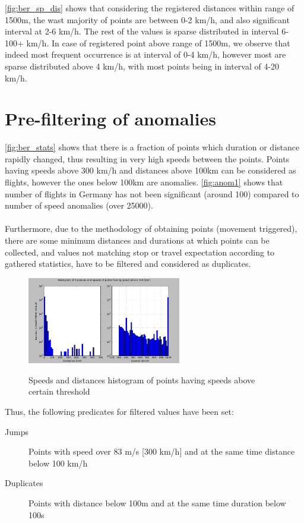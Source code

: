\FloatBarrier
\autoref{fig:ber_sp_dis} shows that considering the registered distances within range of 1500m, the wast majority of points are between 0-2 km/h, and also significant interval at 2-6 km/h. The rest of the values is sparse distributed in interval 6-100+ km/h. In case of registered point above range of 1500m, we observe that indeed most frequent occurrence is at interval of 0-4 km/h, however most are sparse distributed above 4 km/h, with most points being in interval of 4-20 km/h. 

\section{Pre-filtering of anomalies}
\label{cha:prefilter}
\autoref{fig:ber_stats} shows that there is a fraction of points which duration or distance rapidly changed, thus resulting in very high speeds between the points. Points having speeds above 300 km/h and distances above 100km can be considered as flights, however the ones below 100km are anomalies. \autoref{fig:anom1} shows that number of flights in Germany has not been significant (around 100) compared to number of speed anomalies (over 25000).
\\\\
Furthermore, due to the methodology of obtaining points (movement triggered), there are some minimum distances and durations at which points can be collected, and values not matching stop or travel expectation according to gathered statistics, have to be filtered and considered as duplicates. 

\begin{figure}[!ht]
	\centering
	\includegraphics[width=0.6\textwidth]{images/anom1.png}\\
	\caption{ Speeds and distances histogram of points having speeds above certain threshold }
	\label{fig:anom1}
\end{figure}
\FloatBarrier

Thus, the following predicates for filtered values have been set:
\begin{description}
	\item[Jumps] Points with speed over 83 m/s [300 km/h] and at the same time distance below 100 km/h
	\item[Duplicates] Points with distance below 100m and at the same time duration below 100s
\end{description}

